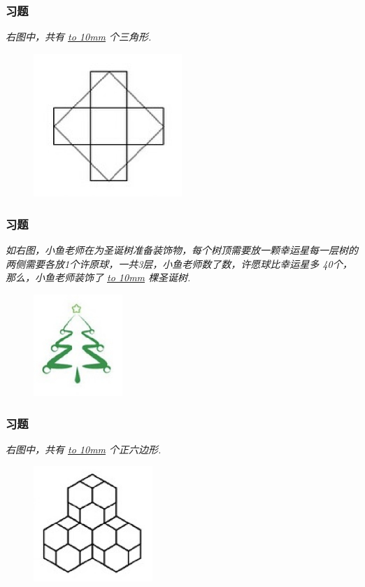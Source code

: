 \begin{frame}
    \frametitle{习题\theframecounter}
    \textit{右图中，共有 \underline{\hbox to 10mm{}} 个三角形.}
    \begin{figure}[H] 
        \centering
        \includegraphics[width=0.5\textwidth]{./pics/Chapter_6/12.png}
    \end{figure}
\end{frame}

\begin{frame}
    \frametitle{习题\theframecounter}
    \textit{如右图，小鱼老师在为圣诞树准备装饰物，每个树顶需要放一颗幸运星每一层树的两侧需要各放1个许原球，一共3层，小鱼老师数了数，许愿球比幸运星多 40个，那么，小鱼老师装饰了 \underline{\hbox to 10mm{}} 棵圣诞树.}
    \begin{figure}[H] 
        \centering
        \includegraphics[width=0.3\textwidth]{./pics/Chapter_6/13.png}
    \end{figure}
\end{frame}


\begin{frame}
    \frametitle{习题\theframecounter}
    \textit{右图中，共有 \underline{\hbox to 10mm{}} 个正六边形.}
    \begin{figure}[H] 
        \centering
        \includegraphics[width=0.4\textwidth]{./pics/Chapter_6/14.png}
    \end{figure}
\end{frame}

